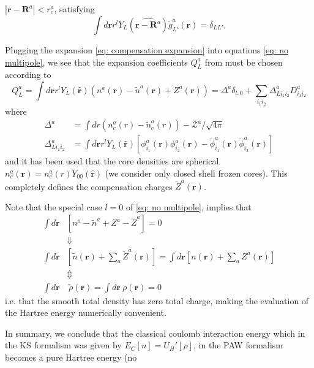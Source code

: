 \documentclass[a4paper]{article}
\newcommand{\f}[1]{\mathbf{#1}}
\newcommand{\s}[1]{\tilde{#1}}
\newcommand{\h}[1]{\hat{#1}}
\newcommand{\wh}[1]{\widehat{#1}}
\newcommand{\br}{\mathbf{r}}
\newcommand{\bR}{\mathbf{R}}
\newcommand{\Z}{\mathcal{Z}}
\begin{document}
$|\br-\bR^a|<r_c^a$, satisfying
%
\begin{equation}
  \int d\br r^l Y_L(\wh{\br-\bR^a}) \s{g}_{L'}^a(\br) = \delta_{LL'}.
\end{equation}
%
\par Plugging the expansion \ref{eq: compensation expansion} into
equations \ref{eq: no multipole}, we see that the expansion
coefficients $Q_L^a$ from must be chosen according to
%
\begin{equation}\label{eq: compensation multipoles}
  Q_L^a = \int d\br r^l Y_L(\hat{\br}) \left(n^a(\br) - \s{n}^a(\br) + Z^a(\br)\right) =\Delta^a\delta_{l,0} + \sum_{i_1i_2}\Delta_{L i_1i_2}^aD_{i_1i_2}^a
\end{equation}
%
where
%
\begin{subequations}
  \begin{align}
    \Delta^a &= \int dr \left(n_c^a(r) - \s{n}_c^a(r)\right) - \Z^a / \sqrt{4\pi}\label{eq: Delta^a}\\
    \Delta_{L i_1i_2}^a &= \int d\br r^l Y_L(\h{\br})[\phi_{i_1}^a(\br)\phi_{i_2}^{a}(\br) - \s{\phi}_{i_1}^a(\br)\s{\phi}_{i_2}^{a}(\br)]\label{eq: Delta_Lij}
  \end{align}
\end{subequations}
%
and it has been used that the core densities are spherical $n_c^a(\br)
= n_c^a(r) Y_{00}(\hat{\br})$ (we consider only closed shell frozen
cores). This completely defines the compensation charges
$\s{Z}^a(\br)$.
\par Note that the special case $l=0$ of \ref{eq: no multipole}, implies that
%
\begin{align}
\int d\f{r} &\left[ n^a - \s{n}^a +Z^a - \s{Z}^a \right] = 0\nonumber\\
& \Downarrow\nonumber\\
\int d\f{r} &\left[\s{n}(\br) + \sum_a \s{Z}^a(\br) \right] = \int d\f{r} \left[n(\br) + \sum_a Z^a(\br)\right]\nonumber\\
& \Updownarrow\nonumber\\
\int d\br &~\s{\rho}(\br) = \int d\br ~\rho(\br) = 0\label{eq: rhot charge neutral}
\end{align}
%
i.e. that the smooth total density has zero total charge, making the
evaluation of the Hartree energy numerically convenient.
\par In summary, we conclude that the classical coulomb interaction
energy which in the KS formalism was given by $E_C[n] = U_H'[\rho]$,
in the PAW formalism becomes a pure Hartree energy (no
\end{document}
